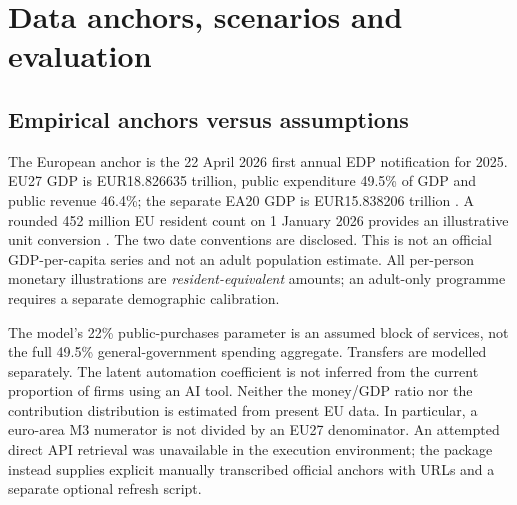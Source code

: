 \section{Data anchors, scenarios and evaluation}
\subsection{Empirical anchors versus assumptions}
The European anchor is the 22 April 2026 first annual EDP notification for 2025. EU27 GDP is EUR18.826635 trillion, public expenditure 49.5\% of GDP and public revenue 46.4\%; the separate EA20 GDP is EUR15.838206 trillion \citep{eurostat2026}. A rounded 452 million EU resident count on 1 January 2026 provides an illustrative unit conversion \citep{population2026}. The two date conventions are disclosed. This is not an official GDP-per-capita series and not an adult population estimate. All per-person monetary illustrations are \emph{resident-equivalent} amounts; an adult-only programme requires a separate demographic calibration.

The model's 22\% public-purchases parameter is an assumed block of services, not the full 49.5\% general-government spending aggregate. Transfers are modelled separately. The latent automation coefficient is not inferred from the current proportion of firms using an AI tool. Neither the money/GDP ratio nor the contribution distribution is estimated from present EU data. In particular, a euro-area M3 numerator is not divided by an EU27 denominator. An attempted direct API retrieval was unavailable in the execution environment; the package instead supplies explicit manually transcribed official anchors with URLs and a separate optional refresh script.

